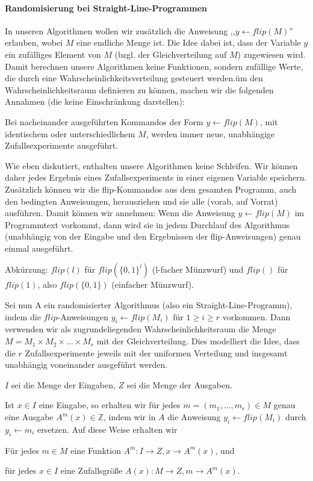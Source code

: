\documentclass[a4paper]{article}
\begin{document}
\begin{multicols}{3}
    \paragraph{Randomisierung bei Straight-Line-Programmen}
    In unseren Algorithmen wollen wir zusätzlich die Anweisung ,,$y\leftarrow flip(M)$'' erlauben, wobei $M$ eine endliche Menge ist. Die Idee dabei ist, dass der Variable $y$ ein zufälliges Element von $M$ (bzgl. der Gleichverteilung auf $M$) zugewiesen wird. Damit berechnen unsere Algorithmen keine Funktionen, sondern zufällige Werte, die durch eine Wahrscheinlichkeitsverteilung gesteuert werden.üm den Wahrscheinlichkeitsraum definieren zu können, machen wir die folgenden Annahmen (die keine Einschränkung darstellen):
    \begin{enumerate*}
        \item Bei nacheinander ausgeführten Kommandos der Form $y\leftarrow flip(M)$, mit identischem oder unterschiedlichem $M$, werden immer neue, unabhängige Zufallsexperimente ausgeführt.
        \item Wie eben diskutiert, enthalten unsere Algorithmen keine Schleifen. Wir können daher jedes Ergebnis eines Zufallsexperiments in einer eigenen Variable speichern. Zusätzlich können wir die flip-Kommandos aus dem gesamten Programm, auch den bedingten Anweisungen, herausziehen und sie alle (vorab, auf Vorrat) ausführen. Damit können wir annehmen: Wenn die Anweisung $y\leftarrow flip(M)$ im Programmtext vorkommt, dann wird sie in jedem Durchlauf des Algorithmus (unabhängig von der Eingabe und den Ergebnissen der flip-Anweisungen) genau einmal ausgeführt.
    \end{enumerate*}

    Abkürzung: $flip(l)$ für $flip(\{0,1\}^l)$ (l-facher Münzwurf) und $flip()$ für $flip(1)$, also $flip(\{0,1\})$ (einfacher Münzwurf).

    Sei nun A ein randomisierter Algorithmus (also ein Straight-Line-Programm), indem die $flip$-Anweisungen $y_i\leftarrow flip(M_i)$ für $1\geq i\geq r$ vorkommen. Dann verwenden wir als zugrundeliegenden Wahrscheinlichkeitsraum die Menge $M=M_1\times M_2\times...\times M_r$ mit der Gleichverteilung. Dies modelliert die Idee, dass die $r$ Zufallsexperimente jeweils mit der uniformen Verteilung und insgesamt unabhängig voneinander ausgeführt werden.

    $I$ sei die Menge der Eingaben, $Z$ sei die Menge der Ausgaben.

    Ist $x\in I$ eine Eingabe, so erhalten wir für jedes $m=(m_1,...,m_r)\in M$ genau eine Ausgabe $A^m(x)\in\mathbb{Z}$, indem wir in $A$ die Anweisung $y_i\leftarrow flip(M_i)$ durch $y_i\leftarrow m_i$ ersetzen. Auf diese Weise erhalten wir
    \begin{itemize*}
        \item Für jedes $m\in M$ eine Funktion $A^m:I\rightarrow Z,x \rightarrow A^m(x)$, und
        \item für jedes $x\in I$ eine Zufallsgröße $A(x):M\rightarrow Z,m\rightarrow A^m(x)$.
    \end{itemize*}


\end{multicols}
\end{document}
